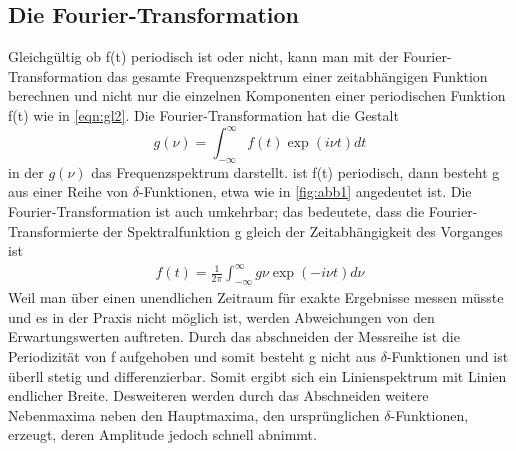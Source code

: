 \subsection{Die Fourier-Transformation}
Gleichgültig ob f(t) periodisch ist oder nicht, kann man mit der Fourier-Transformation das gesamte Frequenzspektrum einer zeitabhängigen Funktion berechnen
und nicht nur die einzelnen Komponenten einer periodischen Funktion f(t) wie in \ref{eqn:gl2}.
Die Fourier-Transformation hat die Gestalt
\begin{equation}
  g(\nu) = \int_{-\infty}^{\infty} f(t) \exp{(i \nu t)} dt \label{eqn:gl3}
\end{equation}
in der $g(\nu)$ das Frequenzspektrum darstellt.
ist f(t) periodisch, dann besteht g aus einer Reihe von $\delta$-Funktionen, etwa wie in \ref{fig:abb1} angedeutet ist.
Die Fourier-Transformation ist auch umkehrbar; das bedeutete, dass die Fourier-Transformierte der Spektralfunktion g gleich der Zeitabhängigkeit des Vorganges ist
\begin{align}
  f(t) = \frac{1}{2 \pi} \int_{-\infty}^{\infty} g{\nu} \exp{(-i \nu t)} d \nu
\end{align}
Weil man über einen unendlichen Zeitraum für exakte Ergebnisse messen müsste und es in der Praxis nicht möglich ist, werden Abweichungen von den Erwartungswerten auftreten.
Durch das abschneiden der Messreihe ist die Periodizität von f aufgehoben und somit besteht g nicht aus $\delta$-Funktionen und ist überll stetig und differenzierbar.
Somit ergibt sich ein Linienspektrum mit Linien endlicher Breite.
Desweiteren werden durch das Abschneiden weitere Nebenmaxima neben den Hauptmaxima, den ursprünglichen $\delta$-Funktionen, erzeugt, deren Amplitude jedoch schnell abnimmt.\cite{AnleitungV351}
